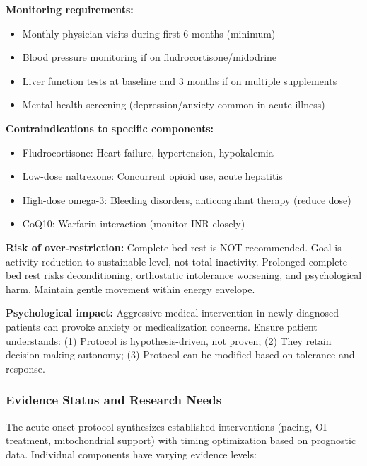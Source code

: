\begin{warning}
\label{warn:acute-onset-safety}

\textbf{Monitoring requirements:}
\begin{itemize}
    \item Monthly physician visits during first 6 months (minimum)
    \item Blood pressure monitoring if on fludrocortisone/midodrine
    \item Liver function tests at baseline and 3 months if on multiple supplements
    \item Mental health screening (depression/anxiety common in acute illness)
\end{itemize}

\textbf{Contraindications to specific components:}
\begin{itemize}
    \item Fludrocortisone: Heart failure, hypertension, hypokalemia
    \item Low-dose naltrexone: Concurrent opioid use, acute hepatitis
    \item High-dose omega-3: Bleeding disorders, anticoagulant therapy (reduce dose)
    \item CoQ10: Warfarin interaction (monitor INR closely)
\end{itemize}

\textbf{Risk of over-restriction:}
Complete bed rest is NOT recommended. Goal is activity reduction to sustainable level, not total inactivity. Prolonged complete bed rest risks deconditioning, orthostatic intolerance worsening, and psychological harm. Maintain gentle movement within energy envelope.

\textbf{Psychological impact:}
Aggressive medical intervention in newly diagnosed patients can provoke anxiety or medicalization concerns. Ensure patient understands: (1) Protocol is hypothesis-driven, not proven; (2) They retain decision-making autonomy; (3) Protocol can be modified based on tolerance and response.
\end{warning}

\subsubsection{Evidence Status and Research Needs}

The acute onset protocol synthesizes established interventions (pacing, OI treatment, mitochondrial support) with timing optimization based on prognostic data. Individual components have varying evidence levels:

